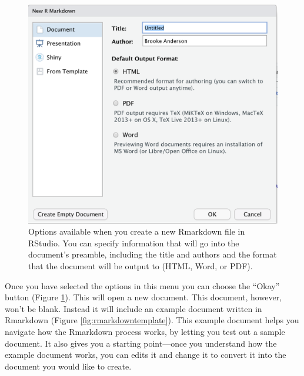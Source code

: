 \documentclass[]{tufte-book}
\begin{document}
\begin{figure}
\includegraphics[width=\textwidth]{figures/rmarkdown_choices} \caption[Options available when you create a new Rmarkdown file in RStudio]{Options available when you create a new Rmarkdown file in RStudio. You can specify information that will go into the document's preamble, including the title and authors and the format that the document will be output to (HTML, Word, or PDF).}\label{fig:rmarkdownchoices}
\end{figure}

Once you have selected the options in this menu you can choose the ``Okay'' button
(Figure \ref{fig:rmarkdownchoices}). This will open a new document. This
document, however, won't be blank. Instead it will include an example document
written in Rmarkdown (Figure \ref{fig:rmarkdowntemplate}). This example
document helps you navigate how the Rmarkdown process works, by letting you test
out a sample document. It also gives you a starting point---once you understand
how the example document works, you can edits it and change it to convert it
into the document you would like to create.
\end{document}
